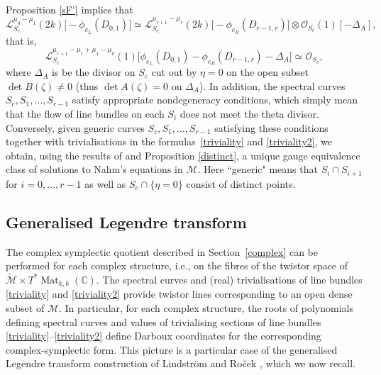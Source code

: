 \documentclass[pdftex]{sigma}
\newcommand{\cx}{{\mathbb C}}
\newcommand{\Mat}{\operatorname{Mat}}
\numberwithin{equation}{section}
\newcommand{\sM}{{\mathcal{M}}} %
\newcommand{\sO}{{\mathcal{O}}}
\begin{document}
{ Proposition \ref{sF'} implies that
\[
\mathscr{L}_{S_c}^{\mu_0-\mu_1}(2k)\bigl[-\phi_{c_L} (D_{0,1} )\bigr]\simeq \mathscr{L}_{S_c}^{\mu_{r+1}-\mu_r}(2k)\bigl[-\phi_{c_R} (D_{r-1,r} )\bigr]\otimes \sO_{S_c}(1)[-\Delta_A],
\]
that is,
 \begin{equation} \mathscr{L}_{S_c}^{\mu_{r+1}-\mu_r+\mu_1-\mu_0}(1)\bigl[\phi_{c_L} (D_{0,1} )-\phi_{c_R} (D_{r-1,r} )-\Delta_A\bigr]\simeq \sO_{S_c},\label{triviality2}
 \end{equation}
 where $\Delta_A$ is be the divisor on $S_c$ cut out by $\eta=0$ on the open subset $\det B(\zeta)\neq 0$ (thus $\det A(\zeta)=0$ on $\Delta_A$).
In addition, the spectral curves $S_c,S_1,\dots, S_{r-1}$ satisfy appropriate nondegeneracy conditions, which simply mean that the flow of line bundles on each $S_i$ does not meet the theta divisor. Conversely, given generic curves $S_c,S_1,\dots, S_{r-1}$ satisfying these conditions together with trivialisations in the formulas~\eqref{triviality} and \eqref{triviality2}, we obtain, using the results of \cite{HM} and Proposition \ref{distinct}, a unique gauge equivalence class of solutions to Nahm's equations in $\sM$. Here ``generic" means that $S_i \cap S_{i+1}$ for $i=0,\dots,r-1$ as well as $S_c\cap \{\eta=0\}$ consist of distinct points.

 \subsection{Generalised Legendre transform}
 The complex symplectic quotient described in Section~\ref{complex} can be performed for each complex structure, i.e., on the fibres of the twistor space of $\tilde \sM\times T^\ast \Mat_{k,k}(\cx)$. The spectral curves and (real) trivialisations of line bundles \eqref{triviality} and \eqref{triviality2} provide twistor lines corresponding to an open dense subset of $\sM$. In particular, for each complex structure, the roots of polynomials defining spectral curves and values of trivialising sections of line bundles \eqref{triviality}--\eqref{triviality2} define Darboux coordinates for the corresponding complex-symplectic form. This picture is a particular case of the generalised Legendre transform construction of Lindstr\"om and Ro\v{c}ek \cite{HKLR,LR}, which we now recall.

}
\end{document}
